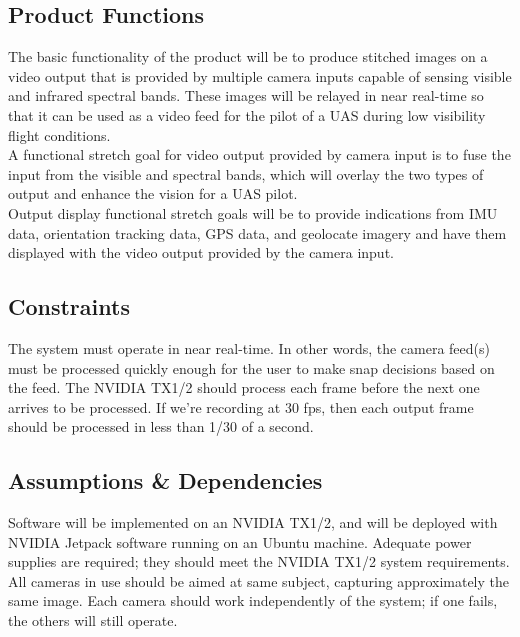 \documentclass[letterpaper,10pt,serif,draftclsnofoot,onecolumn,compsoc,titlepage]{IEEEtran}
\begin{document}
\subsection{Product Functions}

The basic functionality of the product will be to produce stitched images on a video 
output that is provided by multiple camera inputs capable of sensing visible and 
infrared spectral bands. These images will be relayed in near real-time so that it 
can be used as a video feed for the pilot of a UAS during low visibility flight 
conditions. \\

A functional stretch goal for video output provided by camera input is to fuse the 
input from the visible and spectral bands, which will overlay the two types of output 
and enhance the vision for a UAS pilot. \\

Output display functional stretch goals will be to provide indications from IMU data, 
orientation tracking data, GPS data, and geolocate imagery and have them displayed 
with the video output provided by the camera input. \\

\subsection{Constraints}

The system must operate in near real-time. In other words, the camera feed(s) must be 
processed quickly enough for the user to make snap decisions based on the feed. The 
NVIDIA TX1/2 should process each frame before the next one arrives to be processed. 
If we’re recording at 30 fps, then each output frame should be processed in less than 
1/30 of a second.\\

\subsection{Assumptions \& Dependencies}

Software will be implemented on an NVIDIA TX1/2, and will be deployed with NVIDIA 
Jetpack software running on an Ubuntu machine. Adequate power supplies are required; 
they should meet the NVIDIA TX1/2 system requirements. All cameras in use should be 
aimed at same subject, capturing approximately the same image. Each camera should 
work independently of the system; if one fails, the others will still operate.\\
\end{document}
